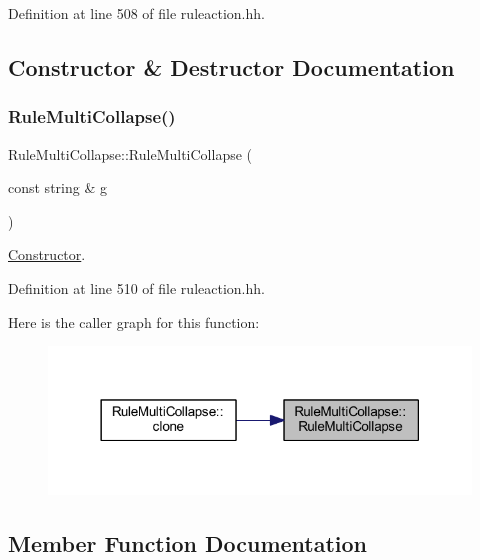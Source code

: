 Definition at line 508 of file ruleaction.\+hh.



\subsection{Constructor \& Destructor Documentation}
\mbox{\label{class_rule_multi_collapse_abc8e95c53f2e88e7859650b5b7a75e36}} 
\subsubsection{\texorpdfstring{RuleMultiCollapse()}{RuleMultiCollapse()}}
{\footnotesize\ttfamily Rule\+Multi\+Collapse\+::\+Rule\+Multi\+Collapse (\begin{DoxyParamCaption}\item[{const string \&}]{g }\end{DoxyParamCaption})\hspace{0.3cm}{\ttfamily [inline]}}



\mbox{\hyperlink{class_constructor}{Constructor}}. 



Definition at line 510 of file ruleaction.\+hh.

Here is the caller graph for this function\+:
\nopagebreak
\begin{figure}[H]
\begin{center}
\leavevmode
\includegraphics[width=318pt]{class_rule_multi_collapse_abc8e95c53f2e88e7859650b5b7a75e36_icgraph}
\end{center}
\end{figure}


\subsection{Member Function Documentation}
\mbox{\label{class_rule_multi_collapse_a65f32f0c3dfaad6ba711cb1c9dc72954}} 
